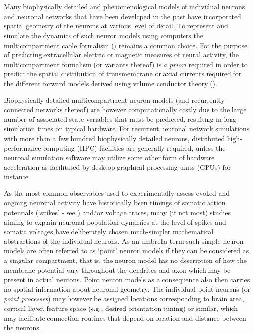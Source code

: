 



\section{}
\label{sec:Schemes:HybridLFPy}


Many biophysically detailed and phenomenological models of individual neurons and neuronal networks that have been developed in the past have incorporated spatial geometry of the neurons at various level of detail.
To represent and simulate the dynamics of such neuron models using computers the multicompartment cable formalism () remains a common choice.
For the purpose of predicting extracellular electric or magnetic measures of neural activity,
the multicompartment formalism (or variants thereof) is \emph{a priori} required in order to predict the spatial distribution of transmembrane or axial currents required for the different forward models derived using volume conductor theory ().

Biophysically detailed multicompartment neuron models (and recurrently connected networks thereof) are however computationally costly due to the large number of associated state variables that must be predicted,
resulting in long simulation times on typical hardware.
For recurrent neuronal network simulations with more than a few hundred biophysically detailed neurons, distributed high-performance computing (HPC) facilities are generally required,
unless the neuronal simulation software may utilize some other form of hardware acceleration as facilitated by desktop graphical processing units (GPUs) for instance.

As the most common observables used to experimentally assess evoked and ongoing neuronal activity have historically been timings of somatic action potentials (`spikes' - see ) and/or voltage traces,
many (if not most) studies aiming to explain neuronal population dynamics at the level of spikes and somatic voltages have deliberately chosen much-simpler mathematical abstractions of the individual neurons.
As an umbrella term such simple neuron models are often referred to as `point' neuron models if they can be considered as a singular compartment,
that is,
the neuron model has no description of how the membrane potential vary throughout the dendrites and axon which may be present in actual neurons.
Point neuron models as a consequence also then carries no spatial information about neuronal geometry.
The individual point neurons (or \emph{point processes}) may however be assigned locations corresponding to brain area, cortical layer, feature space (e.g., desired orientation tuning) or similar,
which may facilitate connection routines that depend on location and distance between the neurons.

